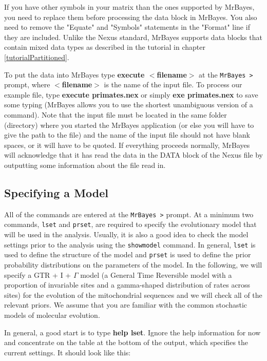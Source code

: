 \documentclass[12pt]{book}
\begin{document}
If you have other symbols in your matrix than the ones supported by MrBayes, you need to replace
them before processing the data block in MrBayes. You also need to remove the "Equate" and
"Symbols" statements in the "Format" line if they are included. Unlike the Nexus standard, MrBayes
supports data blocks that contain mixed data types as described in the tutorial in chapter
\ref{tutorialPartitioned}.

To put the data into MrBayes type \textbf{execute $<$filename$>$} at the \texttt{MrBayes >} prompt,
where \textbf{$<$filename$>$} is the name of the input file. To process our example file, type
\textbf{execute primates.nex} or simply \textbf{exe primates.nex} to save some typing (MrBayes
allows you to use the shortest unambiguous version of a command). Note that the input file must be
located in the same folder (directory) where you started the MrBayes application (or else you will
have to give the path to the file) and the name of the input file should not have blank spaces, or
it will have to be quoted. If everything proceeds normally, MrBayes will acknowledge that it has
read the data in the DATA block of the Nexus file by outputting some information about the file
read in.

\subsection{Specifying a Model}
All of the commands are entered at the \texttt{MrBayes >} prompt. At a minimum two commands,
\texttt{lset} and \texttt{prset}, are required to specify the evolutionary model that will be used
in the analysis. Usually, it is also a good idea to check the model settings prior to the analysis
using the \texttt{showmodel} command. In general, \texttt{lset} is used to define the structure of
the model and \texttt{prset} is used to define the prior probability distributions on the
parameters of the model. In the following, we will specify a GTR + I + $\Gamma$ model (a General
Time Reversible model with a proportion of invariable sites and a gamma-shaped distribution of
rates across sites) for the evolution of the mitochondrial sequences and we will check all of the
relevant priors. We assume that you are familiar with the common stochastic models of molecular
evolution.

In general, a good start is to type \textbf{help lset}. Ignore the help information for now and
concentrate on the table at the bottom of the output, which specifies the current settings. It
should look like this:
\end{document}
